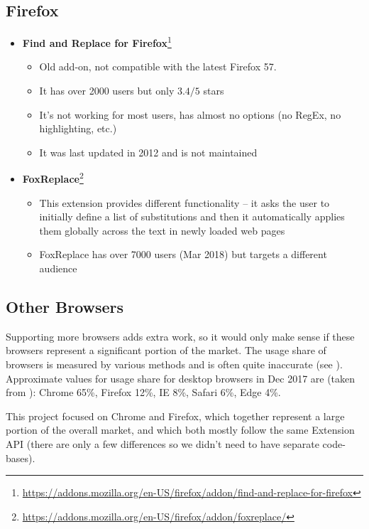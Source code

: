 \documentclass[bsc,frontabs,twoside,singlespacing,parskip,deptreport]{infthesis}
\providecommand{\tightlist}{%
  \setlength{\itemsep}{0pt}\setlength{\parskip}{0pt}}
\begin{document}
\subsection{Firefox}

\begin{itemize}
\item
  \textbf{Find and Replace for Firefox}\footnote{\href{https://addons.mozilla.org/en-US/firefox/addon/find-and-replace-for-firefox}{https://addons.mozilla.org/en-US/firefox/addon/find-and-replace-for-firefox}}
  \begin{itemize}
  \tightlist
\item
  Old add-on, not compatible with the latest Firefox 57.
\item
  It has over 2000 users but only $3.4/5$ stars
\item
  It's not working for most users, has almost no options (no RegEx, no highlighting, etc.)
\item
  It was last updated in 2012 and is not maintained
  \end{itemize}
\item
  \textbf{FoxReplace}\footnote{\href{https://addons.mozilla.org/en-US/firefox/addon/foxreplace/}{https://addons.mozilla.org/en-US/firefox/addon/foxreplace/}}
  \begin{itemize}
  \tightlist
\item
  This extension provides different functionality -- it asks the user to initially define a list of substitutions and then it automatically applies them globally across the text in newly loaded web pages
\item
  FoxReplace has over 7000 users (Mar 2018) but targets a different audience
  \end{itemize}
\end{itemize}

\subsection{Other Browsers}
Supporting more browsers adds extra work, so it would only make sense if these browsers represent a significant portion of the market. The usage share of browsers is measured by various methods and is often quite inaccurate (see \cite{W1}). \\
Approximate values for usage share for desktop browsers in Dec 2017 are (taken from \cite{A1}): Chrome 65\%, Firefox 12\%, IE 8\%, Safari 6\%, Edge 4\%.

This project focused on Chrome and Firefox, which together represent a large portion of the overall market, and which both mostly follow the same Extension API (there are only a few differences \cite{M5} so we didn't need to have separate code-bases).
\end{document}
